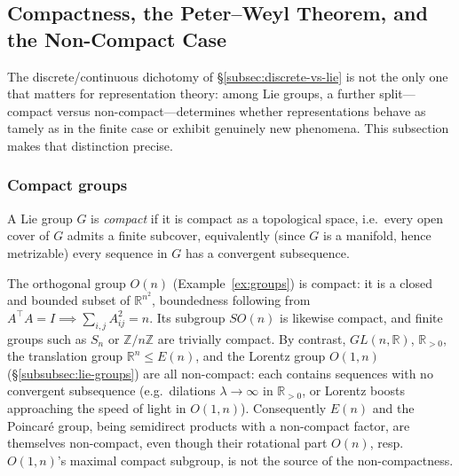 \documentclass[mathematics,review,submit,moreauthors]{Definitions/mdpi}
\begin{document}

\subsection{Compactness, the Peter--Weyl Theorem, and the Non-Compact Case}
\label{subsec:compactness-peter-weyl}

The discrete/continuous dichotomy of \S\ref{subsec:discrete-vs-lie} is not
the only one that matters for representation theory: among Lie groups, a
further split---compact versus non-compact---determines whether
representations behave as tamely as in the finite case or exhibit genuinely
new phenomena. This subsection makes that distinction precise.

\subsubsection{Compact groups}
\label{subsubsec:compact-groups}

\begin{Definition}
\label{def:compact-group}
A Lie group $G$ is \emph{compact} if it is compact as a topological space,
i.e.\ every open cover of $G$ admits a finite subcover, equivalently (since
$G$ is a manifold, hence metrizable) every sequence in $G$ has a convergent
subsequence.
\end{Definition}

\begin{Example}
\label{ex:compactness}
The orthogonal group $O(n)$ (Example~\ref{ex:groups}) is compact: it is a
closed and bounded subset of $\mathbb{R}^{n^2}$, boundedness following from
$A^\top A = I \implies \sum_{i,j} A_{ij}^2 = n$. Its subgroup $SO(n)$ is
likewise compact, and finite groups such as $S_n$ or $\mathbb{Z}/n\mathbb{Z}$
are trivially compact. By contrast, $GL(n,\mathbb{R})$, $\mathbb{R}_{>0}$,
the translation group $\mathbb{R}^n \leq E(n)$, and the Lorentz group
$O(1,n)$ (\S\ref{subsubsec:lie-groups}) are all non-compact: each contains
sequences with no convergent subsequence (e.g.\ dilations $\lambda \to
\infty$ in $\mathbb{R}_{>0}$, or Lorentz boosts approaching the speed of
light in $O(1,n)$). Consequently $E(n)$ and the Poincar\'e group, being
semidirect products with a non-compact factor, are themselves non-compact,
even though their rotational part $O(n)$, resp.\ $O(1,n)$'s maximal compact
subgroup, is not the source of the non-compactness.
\end{Example}
\end{document}
